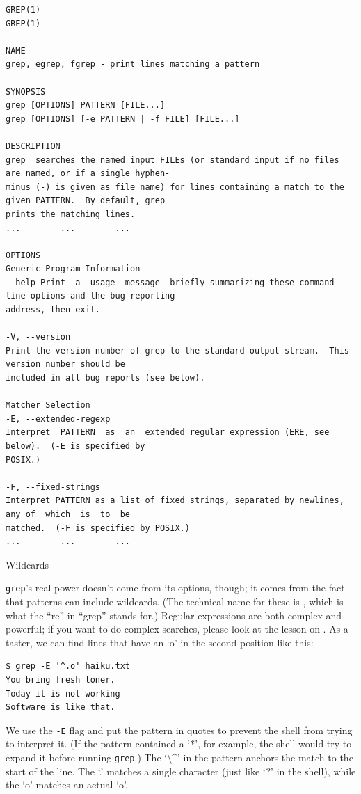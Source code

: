 \documentclass{book}
\begin{document}
\begin{verbatim}
GREP(1)                                                                                              GREP(1)

NAME
grep, egrep, fgrep - print lines matching a pattern

SYNOPSIS
grep [OPTIONS] PATTERN [FILE...]
grep [OPTIONS] [-e PATTERN | -f FILE] [FILE...]

DESCRIPTION
grep  searches the named input FILEs (or standard input if no files are named, or if a single hyphen-
minus (-) is given as file name) for lines containing a match to the given PATTERN.  By default, grep
prints the matching lines.
...        ...        ...

OPTIONS
Generic Program Information
--help Print  a  usage  message  briefly summarizing these command-line options and the bug-reporting
address, then exit.

-V, --version
Print the version number of grep to the standard output stream.  This version number should be
included in all bug reports (see below).

Matcher Selection
-E, --extended-regexp
Interpret  PATTERN  as  an  extended regular expression (ERE, see below).  (-E is specified by
POSIX.)

-F, --fixed-strings
Interpret PATTERN as a list of fixed strings, separated by newlines, any of  which  is  to  be
matched.  (-F is specified by POSIX.)
...        ...        ...
\end{verbatim}

\begin{swcbox}{Wildcards}

\texttt{grep}'s real power doesn't come from its options, though; it
comes from the fact that patterns can include wildcards. (The technical
name for these is ,
which is what the ``re'' in ``grep'' stands for.) Regular expressions
are both complex and powerful; if you want to do complex searches,
please look at the lesson on . As a taster, we can find lines that have an `o' in the second
position like this:

\begin{verbatim}
$ grep -E '^.o' haiku.txt
You bring fresh toner.
Today it is not working
Software is like that.
\end{verbatim}

We use the \texttt{-E} flag and put the pattern in quotes to prevent the
shell from trying to interpret it. (If the pattern contained a `*', for
example, the shell would try to expand it before running \texttt{grep}.)
The `\textbackslash{}\^{}' in the pattern anchors the match to the start
of the line. The `.' matches a single character (just like `?' in the
shell), while the `o' matches an actual `o'.

\end{swcbox}
\end{document}

